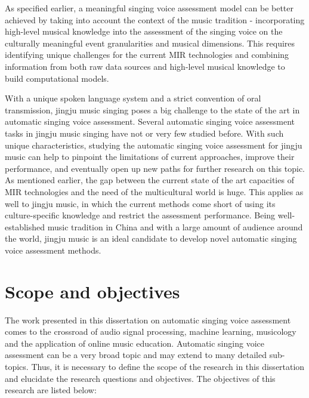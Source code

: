 As specified earlier, a meaningful singing voice assessment model can be better achieved by taking into account the context of the music tradition - incorporating high-level musical knowledge into the assessment of the singing voice on the culturally meaningful event granularities and musical dimensions. This requires identifying unique challenges for the current \gls{MIR} technologies and combining information from both raw data sources and high-level musical knowledge to build computational models.

With a unique spoken language system and a strict convention of oral transmission, jingju music singing poses a big challenge to the state of the art in automatic singing voice assessment. Several automatic singing voice assessment tasks in jingju music singing have not or very few studied before. With such unique characteristics, studying the automatic singing voice assessment for jingju music can help to pinpoint the limitations of current approaches, improve their performance, and eventually open up new paths for further research on this topic. As mentioned earlier, the gap between the current state of the art capacities of \gls{MIR} technologies and the need of the multicultural world is huge. This applies as well to jingju music, in which the current methods come short of using its culture-specific knowledge and restrict the assessment performance. Being well-established music tradition in China and with a large amount of audience around the world, jingju music is an ideal candidate to develop novel automatic singing voice assessment methods.

\section{Scope and objectives}

The work presented in this dissertation on automatic singing voice assessment comes to the crossroad of audio signal processing, machine learning, musicology and the application of online music education. Automatic singing voice assessment can be a very broad topic and may extend to many detailed sub-topics. Thus, it is necessary to define the scope of the research in this dissertation and elucidate the research questions and objectives. The objectives of this research are listed below:

